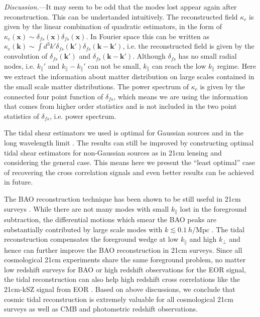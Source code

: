 \documentclass[aps,prl,twocolumn,showpacs,superscriptaddress,groupedaddress,nofootinbib]{revtex4}  %
\newcommand{\mr}{\mathrm}
\begin{document}
{\it Discussion.}---It may seem to be odd that the modes lost appear again
after reconstruction. This can be undertanded intuitively.
The reconstructed field $\kappa_c$ is given by the linear combination of 
quadratic estimators, in the form of 
$\kappa_c(\bm{x})\sim\delta_{fs}(\bm{x})\delta_{fs}(\bm{x})$. In Fourier 
space this can be written as $\kappa_c(\bm{k})\sim\int d^3k'
\delta_{fs}(\bm{k}')\delta_{fs}(\bm{k}-\bm{k}')$, i.e. the reconstructed 
field is given by the convolution of $\delta_{fs}(\bm{k}')$ and 
$\delta_{fs}(\bm{k}-\bm{k}')$. Although $\delta_{fs}$ has no small radial
nodes, i.e. $k_{\parallel}'$ and $k_\parallel-k_{\parallel}'$ can not be small,
$k_\parallel$ can reach the low $k_\parallel$ regime.
Here we extract the information about matter distribution on large scales 
contained in the small scale matter distributions. The power spectrum of 
$\kappa_c$ is given by the connected four point function of $\delta_{fs}$,
which means we are using the information that comes from higher order statistics
and is not included in the two point statistics of $\delta_{fs}$, i.e. 
power spectrum.

The tidal shear estimators we used is optimal for Gaussian sources and in the 
long wavelength limit \cite{2015:zhu}.
The results can still be improved by constructing optimal tidal shear 
estimators for non-Gaussian sources as in 21cm lensing \cite{2010:lu} and 
considering the general case. This means here we present the ``least optimal''
case of recovering the cross correlation signals and even better results can be
achieved in future.

The BAO reconstruction technique \cite{2007:bao} has been shown to be still
useful in 21cm surveys \cite{2015:bao1}\cite{2015:bao2}. While there are not 
many modes with small $k_\parallel$ lost in the foreground subtraction, the 
differential motions which smear the BAO peaks are substantially contributed
by large scale modes with $k\lesssim0.1\ h/\mr{Mpc}$ \cite{2007:bao}.
The tidal reconstruction compensates the foreground wedge at low $k_\parallel$
and high $k_\perp$ and hence can further improve the BAO reconstruction in 
21cm surveys. Since all cosmological 21cm experiments share the same foreground
problem, no matter low redshift surveys for BAO or high redshift observations
for the EOR signal, the tidal reconstruction can also help high redshift cross 
correlations like the 21cm-kSZ signal from EOR \cite{2015:marcelo}. Based
on above discussions, we conclude that cosmic tidal reconstruction is extremely
valuable for all cosmological 21cm surveys as well as CMB and photometric
redshift observations.
\end{document}
